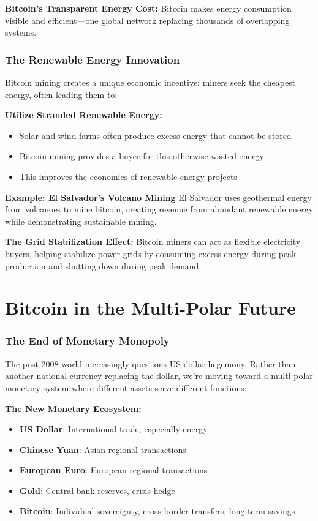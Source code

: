 \documentclass[11pt,oneside]{book}
\begin{document}
\textbf{Bitcoin's Transparent Energy Cost:}
Bitcoin makes energy consumption visible and efficient—one global network replacing thousands of overlapping systems.

\subsubsection{The Renewable Energy Innovation}

Bitcoin mining creates a unique economic incentive: miners seek the cheapest energy, often leading them to:

\textbf{Utilize Stranded Renewable Energy:}
\begin{itemize}
\item Solar and wind farms often produce excess energy that cannot be stored
\item Bitcoin mining provides a buyer for this otherwise wasted energy
\item This improves the economics of renewable energy projects
\end{itemize}

\textbf{Example: El Salvador's Volcano Mining}
El Salvador uses geothermal energy from volcanoes to mine bitcoin, creating revenue from abundant renewable energy while demonstrating sustainable mining.

\textbf{The Grid Stabilization Effect:}
Bitcoin miners can act as flexible electricity buyers, helping stabilize power grids by consuming excess energy during peak production and shutting down during peak demand.

\section{Bitcoin in the Multi-Polar Future}

\subsubsection{The End of Monetary Monopoly}

The post-2008 world increasingly questions US dollar hegemony. Rather than another national currency replacing the dollar, we're moving toward a multi-polar monetary system where different assets serve different functions:

\textbf{The New Monetary Ecosystem:}
\begin{itemize}
\item \textbf{US Dollar}: International trade, especially energy
\item \textbf{Chinese Yuan}: Asian regional transactions
\item \textbf{European Euro}: European regional transactions
\item \textbf{Gold}: Central bank reserves, crisis hedge
\item \textbf{Bitcoin}: Individual sovereignty, cross-border transfers, long-term savings
\end{itemize}
\end{document}
